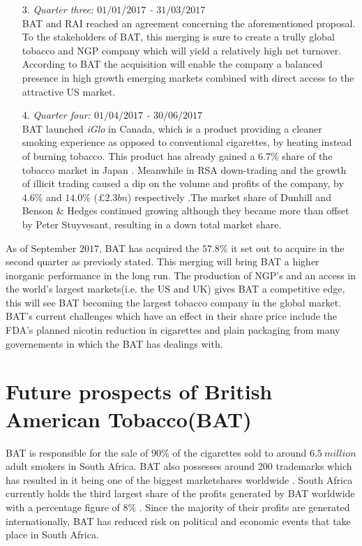 \documentclass[letterpaper, 10 pt, conference]{ieeeconf}  %
\begin{document}
\begin{flushleft}
\begin{enumerate}
 		\item[3.]\textit{Quarter three: $01/01/2017$ - $31/03/2017$}
 		\\
 		BAT and RAI reached an agreement concerning the aforementioned proposal. To the stakeholders of BAT, this merging is sure to create a trully global tobacco and NGP company which will yield a relatively high net turnover. According to BAT the acquisition will enable the company a balanced presence in high growth emerging markets combined with direct access to the attractive US market. 
 		
 		\item[4.]\textit{Quarter four: $01/04/2017$ - $30/06/2017$}
 		\\
 		BAT launched \textit{iGlo} in Canada, which is a product providing a cleaner smoking experience as opposed to conventional cigarettes, by heating instead of burning tobacco. This product has already gained a $6.7\%$ share of the tobacco market in Japan \cite{BAT_nextgen}. Meanwhile in RSA down-trading and the growth of illicit trading caused a dip on the volume and profits of the company, by $4.6\%$ and $14.0\%$ ($\pounds2.3bn$) respectively \cite{Board_Appointment} \cite{business_live}.The market share of Dunhill and Benson \& Hedges continued growing although they became more than offset by Peter Stuyvesant, resulting in a down total market share\cite{Board_Appointment}.

 		

 	\end{enumerate}	
 \end{flushleft}
 
 \begin{flushleft}
 	As of September $2017$,  BAT has acquired the $57.8\%$ it set out to acquire in the second quarter as previosly stated. This merging will bring BAT a higher inorganic performance in the long run. The production of NGP's and an access in the world's largest markets(i.e. the US and UK) gives BAT a competitive edge, this will see BAT becoming the largest tobacco company in the global market. BAT's current challenges which have an effect in their share price include the FDA's planned nicotin reduction in cigarettes and plain packaging from many governements in which the BAT has dealings with.
 \end{flushleft}

\section{Future prospects of British American Tobacco(BAT)}
BAT is responsible for the sale of $90\%$ of the cigarettes sold to around $6.5~million$ adult smokers in South Africa. BAT also possesses around 200 trademarks which has resulted in it being one of the biggest marketshares worldwide \cite{BAT_hist}. South Africa currently holds the third largest share of the profits generated by BAT worldwide with a percentage figure of $8\%$ \cite{BAT_hist}. Since the majority of their profits are generated internationally, BAT has reduced risk on political and economic events that take place in South Africa.
\end{document}
